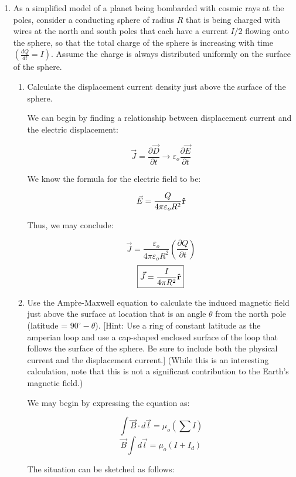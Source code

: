 \begin{enumerate}

  \item As a simplified model of a planet being bombarded with cosmic rays at the poles, consider a conducting sphere of radius $R$ that is being charged with wires at the north and south poles that each have a current $I/2$ flowing onto the sphere, so that the total charge of the sphere is increasing with time $\left( \frac{dQ}{dt}=I \right)$.  Assume the charge is always distributed uniformly on the surface of the sphere.

    \begin{enumerate}

      \item Calculate the displacement current density just above the surface of the sphere.

    We can begin by finding a relationship between displacement current and the electric displacement:

    $$\vec{J}=\frac{\partial \vec{D}}{\partial t}\to\varepsilon_o\frac{\partial\vec{E}}{\partial t}$$

    We know the formula for the electric field to be:

    $$\vec{E}=\frac{Q}{4\pi\varepsilon_o R^2}\bold{\hat{r}}$$

    Thus, we may conclude:

    $$\vec{J}=\frac{\varepsilon_o}{4\pi\varepsilon_o R^2}\left( \frac{\partial Q}{\partial t} \right)$$
    $$\boxed{\vec{J}=\frac{I}{4\pi R^2}\bold{\hat{r}}}$$

      \item Use the Amp\`re-Maxwell equation to calculate the induced magnetic field just above the surface at location that is an angle $\theta$ from the north pole (latitude = $90^{\circ}-\theta$). [Hint: Use a ring of constant latitude as the amperian loop and use a cap-shaped enclosed surface of the loop that follows the surface of the sphere. Be sure to include both the physical current and the displacement current.]  (While this is an interesting calculation, note that this is not a significant contribution to the Earth’s magnetic field.)

        We may begin by expressing the equation as:

        $$\int \vec{B}\cdot d\vec{l}=\mu_o\left( \sum I \right)$$
        $$\vec{B}\int d\vec{l}=\mu_o\left( I+I_d \right)$$

        The situation can be sketched as follows:


\end{enumerate}
\end{enumerate}
